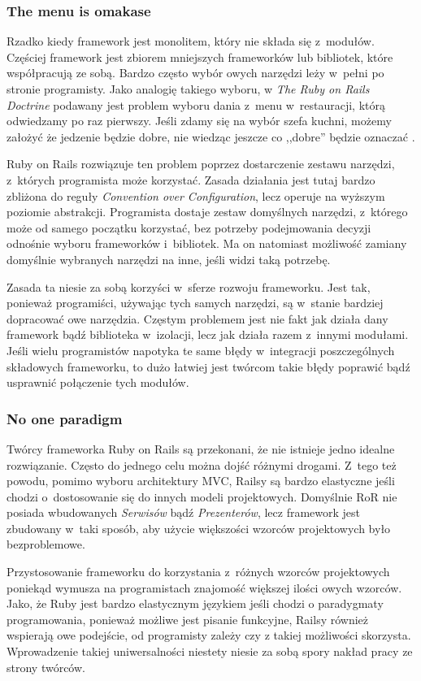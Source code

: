 \documentclass[mgr,oneside]{mgr}
\begin{document}
\subsubsection{The menu is omakase}
Rzadko kiedy framework jest monolitem, który nie składa się z~modułów. Częściej framework jest zbiorem mniejszych frameworków lub bibliotek, które współpracują ze sobą. Bardzo często wybór owych narzędzi leży w~pełni po stronie programisty. Jako analogię takiego wyboru, w \emph{The Ruby on Rails Doctrine} podawany jest problem wyboru dania z~menu w~restauracji, którą odwiedzamy po raz pierwszy. Jeśli zdamy się na wybór szefa kuchni, możemy założyć że jedzenie będzie dobre, nie wiedząc jeszcze co ,,dobre'' będzie oznaczać \cite{rails_doctrine}.

Ruby on Rails rozwiązuje ten problem poprzez dostarczenie zestawu narzędzi, z~których programista może korzystać. Zasada działania jest tutaj bardzo zbliżona do reguły \emph{Convention over Configuration}, lecz operuje na wyższym poziomie abstrakcji. Programista dostaje zestaw domyślnych narzędzi, z~którego może od samego początku korzystać, bez potrzeby podejmowania decyzji odnośnie wyboru frameworków i~bibliotek. Ma on natomiast możliwość zamiany domyślnie wybranych narzędzi na inne, jeśli widzi taką potrzebę.

Zasada ta niesie za sobą korzyści w~sferze rozwoju frameworku. Jest tak, ponieważ programiści, używając tych samych narzędzi, są w~stanie bardziej dopracować owe narzędzia. Częstym problemem jest nie fakt jak działa dany framework bądź biblioteka w~izolacji, lecz jak działa razem z~innymi modułami. Jeśli wielu programistów napotyka te same błędy w~integracji poszczególnych składowych frameworku, to dużo łatwiej jest twórcom takie błędy poprawić bądź usprawnić połączenie tych modułów.

\subsubsection{No one paradigm}
Twórcy frameworka Ruby on Rails są przekonani, że nie istnieje jedno idealne rozwiązanie. Często do jednego celu można dojść różnymi drogami. Z~tego też powodu, pomimo wyboru architektury MVC, Railsy są bardzo elastyczne jeśli chodzi o~dostosowanie się do innych modeli projektowych. Domyślnie RoR nie posiada wbudowanych \textit{Serwisów} bądź \textit{Prezenterów}, lecz framework jest zbudowany w~taki sposób, aby użycie większości wzorców projektowych było bezproblemowe.

Przystosowanie frameworku do korzystania z~różnych wzorców projektowych poniekąd wymusza na programistach znajomość większej ilości owych wzorców. Jako, że Ruby jest bardzo elastycznym językiem jeśli chodzi o paradygmaty programowania, ponieważ możliwe jest pisanie funkcyjne, Railsy również wspierają owe podejście, od programisty zależy czy z takiej możliwości skorzysta. Wprowadzenie takiej uniwersalności niestety niesie za sobą spory nakład pracy ze strony twórców.
\end{document}

